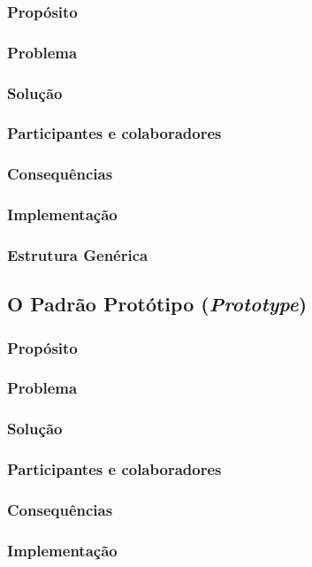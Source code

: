 \documentclass[
	11pt,				%
	openright,
	twoside,			%
	a4paper,			%
	english,			%
	french,
	brazil,				%
	sumario=tradicional
	]{abntex2}
\begin{document}
\subsubsection{Propósito}
\subsubsection{Problema}
\subsubsection{Solução}
\subsubsection{Participantes e colaboradores}
\subsubsection{Consequências}
\subsubsection{Implementação}
\subsubsection{Estrutura Genérica}

\subsection{O Padrão Protótipo (\textit{Prototype})}
\subsubsection{Propósito}
\subsubsection{Problema}
\subsubsection{Solução}
\subsubsection{Participantes e colaboradores}
\subsubsection{Consequências}
\subsubsection{Implementação}
\end{document}
